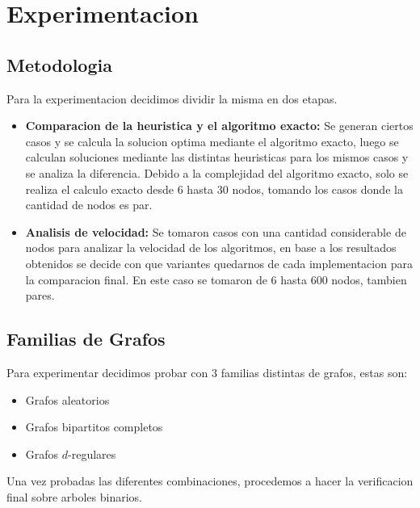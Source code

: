 \section{Experimentacion}

\subsection{Metodologia}

Para la experimentacion decidimos dividir la misma en dos etapas.\\

\begin{itemize}
	\item \textbf{Comparacion de la heuristica y el algoritmo exacto:} Se generan ciertos casos y se calcula la solucion optima mediante el algoritmo exacto, luego se calculan soluciones mediante las distintas heuristicas para los mismos casos y se analiza la diferencia. Debido a la complejidad del algoritmo exacto, solo se realiza el calculo exacto desde 6 hasta 30 nodos, tomando los casos donde la cantidad de nodos es par.
	\item \textbf{Analisis de velocidad:} Se tomaron casos con una cantidad considerable de nodos para analizar la velocidad de los algoritmos, en base a los resultados obtenidos se decide con 	que variantes quedarnos de cada implementacion para la comparacion final. En este caso se tomaron de 6 hasta 600 nodos, tambien pares.
\end{itemize}

\subsection{Familias de Grafos}

Para experimentar decidimos probar con 3 familias distintas de grafos, estas son:

\begin{itemize}
	\item Grafos aleatorios
	\item Grafos bipartitos completos
	\item Grafos $d$-regulares
\end{itemize}

Una vez probadas las diferentes combinaciones, procedemos a hacer la verificacion final sobre arboles binarios.